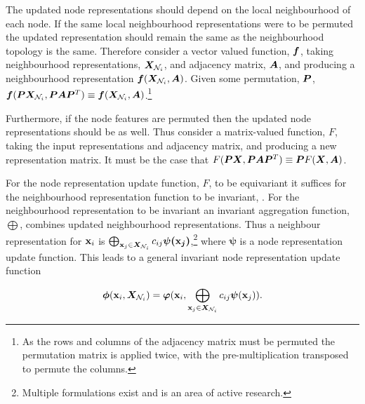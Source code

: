 

The updated node representations should depend on the local neighbourhood of each node.
If the same local neighbourhood representations were to be permuted the updated representation should remain the same as the neighbourhood topology is the same.
Therefore consider a vector valued function, ${\bm{f}}$, taking neighbourhood representations, ${\bm{X}}_{{\mathcal{N}}_i}$, and adjacency matrix, ${\bm{A}}$, and producing a neighbourhood representation ${\bm{f}}({\bm{X}}_{{\mathcal{N}}_i}, {\bm{A}})$.
Given some permutation, ${\bm{P}}$, ${\bm{f}}({\bm{P}}{\bm{X}}_{{\mathcal{N}}_i}, {\bm{P}}{\bm{A}}{\bm{P}}^T) \equiv {\bm{f}}({\bm{X}}_{{\mathcal{N}}_i}, {\bm{A}})$.\footnote{As the rows and columns of the adjacency matrix must be permuted the permutation matrix is applied twice, with the pre-multiplication transposed to permute the columns.}

Furthermore, if the node features are permuted then the updated node representations should be as well.
Thus consider a matrix-valued function, $F$, taking the input representations and adjacency matrix, and producing a new representation matrix.
It must be the case that $F({\bm{P}}{\bm{X}}, {\bm{P}}{\bm{A}}{\bm{P}}^T) \equiv {\bm{P}} F({\bm{X}}, {\bm{A}})$.

For the node representation update function, $F$, to be equivariant it suffices for the neighbourhood representation function to be invariant, .
For the neighbourhood representation to be invariant an invariant aggregation function, $\bigoplus$, combines updated neighbourhood representations.
Thus a neighbour representation for ${\textbf{x}}_i$ is $\bigoplus_{{\textbf{x}}_j \in {\bm{X}}_{{\mathcal{N}}_i}}c_{ij}\bm{\psi({\textbf{x}}_j)}$,\footnote{Multiple formulations exist and is an area of active research.}
where $\bm{\psi}$ is a node representation update function.
This leads to a general invariant node representation update function

\begin{equation}
    \label{eq:conv-def}
    \bm{\phi}({\textbf{x}}_i, {\bm{X}}_{{\mathcal{N}}_i}) = \bm{\varphi}({\textbf{x}}_i, \bigoplus_{{\textbf{x}}_j \in {\bm{X}}_{{\mathcal{N}}_i}}c_{ij}\bm{\psi}({\textbf{x}}_j)).
\end{equation}


